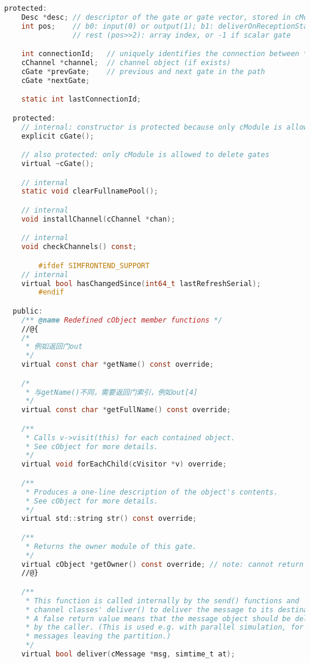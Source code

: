 \begin{lstlisting}[language=c]
  protected:
    Desc *desc; // descriptor of the gate or gate vector, stored in cModule
    int pos;    // b0: input(0) or output(1); b1: deliverOnReceptionStart bit;
                // rest (pos>>2): array index, or -1 if scalar gate

    int connectionId;   // uniquely identifies the connection between *this and *nextgatep; -1 if unconnected
    cChannel *channel;  // channel object (if exists)
    cGate *prevGate;    // previous and next gate in the path
    cGate *nextGate;

    static int lastConnectionId;

  protected:
    // internal: constructor is protected because only cModule is allowed to create instances
    explicit cGate();

    // also protected: only cModule is allowed to delete gates
    virtual ~cGate();

    // internal
    static void clearFullnamePool();

    // internal
    void installChannel(cChannel *chan);

    // internal
    void checkChannels() const;

        #ifdef SIMFRONTEND_SUPPORT
    // internal
    virtual bool hasChangedSince(int64_t lastRefreshSerial);
        #endif

  public:
    /** @name Redefined cObject member functions */
    //@{
    /*
     * 例如返回门out
     */
    virtual const char *getName() const override;

    /*
     * 与getName()不同，需要返回门索引，例如out[4]
     */
    virtual const char *getFullName() const override;

    /**
     * Calls v->visit(this) for each contained object.
     * See cObject for more details.
     */
    virtual void forEachChild(cVisitor *v) override;

    /**
     * Produces a one-line description of the object's contents.
     * See cObject for more details.
     */
    virtual std::string str() const override;

    /**
     * Returns the owner module of this gate.
     */
    virtual cObject *getOwner() const override; // note: cannot return cModule* (covariant return type) due to declaration order
    //@}

    /**
     * This function is called internally by the send() functions and
     * channel classes' deliver() to deliver the message to its destination.
     * A false return value means that the message object should be deleted
     * by the caller. (This is used e.g. with parallel simulation, for
     * messages leaving the partition.)
     */
    virtual bool deliver(cMessage *msg, simtime_t at);


\end{lstlisting}

